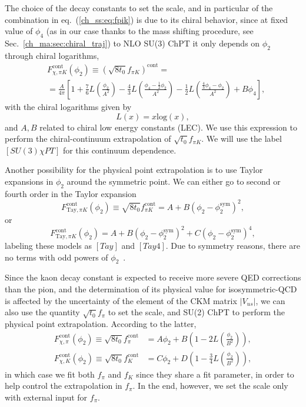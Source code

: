 The choice of the decay constants to set the scale, and in particular of the combination in eq.~(\ref{ch_ss:eq:fpik}) is due to its chiral behavior, since at fixed value of $\phi_4$ (as in our case thanks to the mass shifting procedure, see Sec.~\ref{ch_ma:sec:chiral_traj}) to NLO SU(3) ChPT it only depends on $\phi_2$ through chiral logarithms, 
\begin{align}
\label{ch_ss:eq:SU3ChPT}
&F_{\chi,\pi K}^{\textrm{cont}}(\phi_2)\equiv\left(\sqrt{8t_0}f_{\pi K}\right)^{\textrm{cont}}=\\
&=\frac{A}{4\pi}\left[1+\frac{7}{6}L\left(\frac{\phi_2}{A^2}\right)-\frac{4}{3}L\left(\frac{\phi_4-\frac{1}{2}\phi_2}{A^2}\right)-\frac{1}{2}L\left(\frac{\frac{4}{3}\phi_4-\phi_2}{A^2}\right)+B\phi_4\right],
\end{align}
with the chiral logarithms given by
\begin{equation}
\label{ch_ss:eq:log}
L(x)=x{\textrm{log}}\left(x\right),
\end{equation}
and $A,B$ related to chiral low energy constants (LEC). We use this expression to perform the chiral-continuum extrapolation of $\sqrt{t_0}f_{\pi K}$. We will use the label $[SU(3)\chi PT]$ for this continuum dependence. 

Another possibility for the physical point extrapolation is to use Taylor expansions in $\phi_2$ around the symmetric point. We can either go to second or fourth order in the Taylor expansion
\begin{equation}
\label{ch_ss:eq:Tay}
F_{\textrm{Tay},\pi K}^{\textrm{cont}}(\phi_2)\equiv\sqrt{8t_0}f_{\pi K}^{\textrm{cont}}=A+B\left(\phi_2-\phi_2^{\textrm{sym}}\right)^2,
\end{equation}
or
\begin{equation}
\label{ch_ss:eq:Tay4}
F_{\textrm{Tay},\pi K}^{\textrm{cont}}(\phi_2)=A+B\left(\phi_2-\phi_2^{\textrm{sym}}\right)^2+C\left(\phi_2-\phi_2^{\textrm{sym}}\right)^4,
\end{equation}
labeling these models as $[Tay]$ and $[Tay4]$. Due to symmetry reasons, there are no terms with odd powers of $\phi_2$~\cite{}.

Since the kaon decay constant is expected to receive more severe QED corrections than the pion, and the determination of its physical value for isosymmetric-QCD is affected by the uncertainty of the element of the CKM matrix $|V_{us}|$, we can also use the quantity $\sqrt{t_0}f_{\pi}$ to set the scale, and SU(2) ChPT to perform the physical point extrapolation. According to the latter,
\begin{align}
F_{\chi,\pi}^{\textrm{cont}}(\phi_2)\equiv\sqrt{8t_0}f_{\pi}^{\textrm{cont}}&=A\phi_2+B\left(1-2L\left(\frac{\phi_2}{B^2}\right)\right),\\
F_{\chi,K}^{\textrm{cont}}(\phi_2)\equiv\sqrt{8t_0}f_K^{\textrm{cont}}&=C\phi_2+D\left(1-\frac{3}{4}L\left(\frac{\phi_2}{B^2}\right)\right),
\end{align}
in which case we fit both $f_{\pi}$ and $f_K$ since they share a fit parameter, in order to help control the extrapolation in $f_{\pi}$. In the end, however, we set the scale only with external input for $f_{\pi}$.

